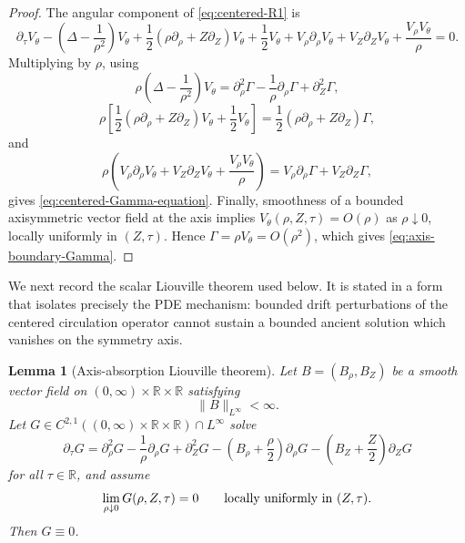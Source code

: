 \documentclass[11pt]{amsart}
\numberwithin{equation}{section}
\theoremstyle{plain}
\newtheorem{lemma}[theorem]{Lemma}
\theoremstyle{definition}
\theoremstyle{remark}
\begin{document}
\begin{proof}
The angular component of \eqref{eq:centered-R1} is
\[
   \partial_\tau V_\theta
   -\left(\Delta-\frac1{\rho^2}\right)V_\theta
   +\frac12(\rho\partial_\rho+Z\partial_Z)V_\theta
   +\frac12V_\theta
   +V_\rho\partial_\rho V_\theta+V_Z\partial_ZV_\theta
   +\frac{V_\rho V_\theta}{\rho}=0 .
\]
Multiplying by \(\rho\), using
\[
   \rho\left(\Delta-\frac1{\rho^2}\right)V_\theta
   =\partial_\rho^2\Gamma-\frac1\rho\partial_\rho\Gamma+
      \partial_Z^2\Gamma,
\]
\[
   \rho\left[\frac12(\rho\partial_\rho+Z\partial_Z)V_\theta
      +\frac12V_\theta\right]
   =\frac12(\rho\partial_\rho+Z\partial_Z)\Gamma,
\]
and
\[
   \rho\left(V_\rho\partial_\rho V_\theta+V_Z\partial_ZV_\theta
      +\frac{V_\rho V_\theta}{\rho}\right)
   =V_\rho\partial_\rho\Gamma+V_Z\partial_Z\Gamma,
\]
gives \eqref{eq:centered-Gamma-equation}.  Finally, smoothness of a bounded
axisymmetric vector field at the axis implies \(V_\theta(\rho,Z,\tau)=O(\rho)\)
as \(\rho\downarrow0\), locally uniformly in \((Z,\tau)\).  Hence
\(\Gamma=\rho V_\theta=O(\rho^2)\), which gives
\eqref{eq:axis-boundary-Gamma}.
\end{proof}

We next record the scalar Liouville theorem used below.  It is stated in a
form that isolates precisely the PDE mechanism: bounded drift perturbations of
the centered circulation operator cannot sustain a bounded ancient solution
which vanishes on the symmetry axis.

\begin{lemma}[Axis-absorption Liouville theorem]
\label{lem:axis-absorption-liouville}
Let \(B=(B_\rho,B_Z)\) be a smooth vector field on
\((0,\infty)\times\mathbb R\times\mathbb R\) satisfying
\[
   \|B\|_{L^\infty}<\infty .
\]
Let \(G\in C^{2,1}((0,\infty)\times\mathbb R\times\mathbb R)\cap L^\infty\)
solve
\begin{equation}\label{eq:abstract-Gamma-equation}
   \partial_\tau G
   =
   \partial_\rho^2G-\frac1\rho\partial_\rho G+
      \partial_Z^2G
   -\left(B_\rho+\frac\rho2\right)\partial_\rho G
   -\left(B_Z+\frac Z2\right)\partial_ZG
\end{equation}
for all \(\tau\in\mathbb R\), and assume
\begin{equation}\label{eq:abstract-axis-zero}
   \lim_{\rho\downarrow0}G(\rho,Z,\tau)=0
   \qquad\hbox{locally uniformly in }(Z,\tau).
\end{equation}
Then \(G\equiv0\).
\end{lemma}
\end{document}
